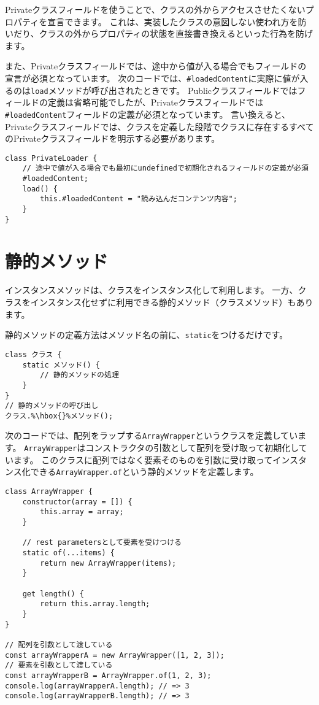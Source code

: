 Privateクラスフィールドを使うことで、クラスの外からアクセスさせたくないプロパティを宣言できます。
これは、実装したクラスの意図しない使われ方を防いだり、クラスの外からプロパティの状態を直接書き換えるといった行為を防げます。

また、Privateクラスフィールドでは、途中から値が入る場合でもフィールドの宣言が必須となっています。
次のコードでは、\texttt{\#loadedContent}に実際に値が入るのは\texttt{load}メソッドが呼び出されたときです。
Publicクラスフィールドではフィールドの定義は省略可能でしたが、Privateクラスフィールドでは\texttt{\#loadedContent}フィールドの定義が必須となっています。
言い換えると、Privateクラスフィールドでは、クラスを定義した段階でクラスに存在するすべてのPrivateクラスフィールドを明示する必要があります。

\begin{lstlisting}
class PrivateLoader {
    // 途中で値が入る場合でも最初にundefinedで初期化されるフィールドの定義が必須
    #loadedContent;
    load() {
        this.#loadedContent = "読み込んだコンテンツ内容";
    }
}
\end{lstlisting}

\hypertarget{static-method}{%
\section{静的メソッド}\label{static-method}}

インスタンスメソッドは、クラスをインスタンス化して利用します。
一方、クラスをインスタンス化せずに利用できる静的メソッド（クラスメソッド）もあります。

静的メソッドの定義方法はメソッド名の前に、\texttt{static}をつけるだけです。

\begin{lstlisting}[escapechar=\%]
class クラス {
    static メソッド() {
        // 静的メソッドの処理
    }
}
// 静的メソッドの呼び出し
クラス.%\hbox{}%メソッド();
\end{lstlisting}

次のコードでは、配列をラップする\texttt{ArrayWrapper}というクラスを定義しています。\enlargethispage{\baselineskip}
\texttt{ArrayWrapper}はコンストラクタの引数として配列を受け取って初期化しています。
このクラスに配列ではなく要素そのものを引数に受け取ってインスタンス化できる\texttt{ArrayWrapper.of}という静的メソッドを定義します。

\begin{lstlisting}
class ArrayWrapper {
    constructor(array = []) {
        this.array = array;
    }

    // rest parametersとして要素を受けつける
    static of(...items) {
        return new ArrayWrapper(items);
    }

    get length() {
        return this.array.length;
    }
}

// 配列を引数として渡している
const arrayWrapperA = new ArrayWrapper([1, 2, 3]);
// 要素を引数として渡している
const arrayWrapperB = ArrayWrapper.of(1, 2, 3);
console.log(arrayWrapperA.length); // => 3
console.log(arrayWrapperB.length); // => 3
\end{lstlisting}

